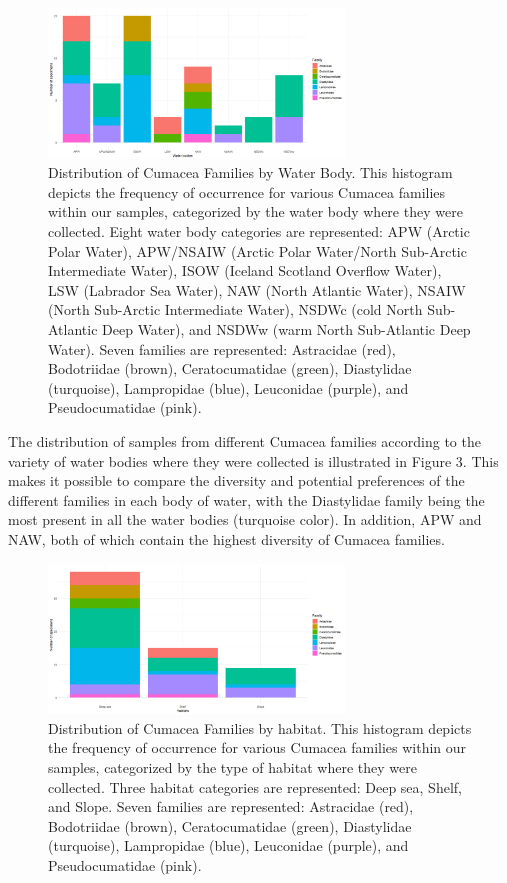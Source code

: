 \begin{figure}[htbp]
    \centering
    \includegraphics[width=0.7\textwidth]{figure3.png}
    \caption{Distribution of Cumacea Families by Water Body. This histogram depicts the frequency of occurrence for various Cumacea families within our samples, categorized by the water body where they were collected. Eight water body categories are represented: APW (Arctic Polar Water), APW/NSAIW (Arctic Polar Water/North Sub-Arctic Intermediate Water), ISOW (Iceland Scotland Overflow Water), LSW (Labrador Sea Water), NAW (North Atlantic Water), NSAIW  (North Sub-Arctic Intermediate Water), NSDWc (cold North Sub-Atlantic Deep Water), and NSDWw (warm North Sub-Atlantic Deep Water). Seven families are represented: Astracidae (red), Bodotriidae (brown), Ceratocumatidae (green), Diastylidae (turquoise), Lampropidae (blue), Leuconidae (purple), and Pseudocumatidae (pink). \label{fig:fig3}}
\end{figure}

The distribution of samples from different Cumacea families according to the variety of water bodies where they were collected is illustrated in Figure 3. This makes it possible to compare the diversity and potential preferences of the different families in each body of water, with the Diastylidae family being the most present in all the water bodies (turquoise color). In addition, APW and NAW, both of which contain the highest diversity of Cumacea families.

\begin{figure}[]
    \centering
    \includegraphics[width=0.7\textwidth]{figure4.png}
    \caption{Distribution of Cumacea Families by habitat. This histogram depicts the frequency of occurrence for various Cumacea families within our samples, categorized by the type of habitat where they were collected. Three habitat categories are represented: Deep sea, Shelf, and Slope. Seven families are represented: Astracidae (red), Bodotriidae (brown), Ceratocumatidae (green), Diastylidae (turquoise), Lampropidae (blue), Leuconidae (purple), and Pseudocumatidae (pink).  \label{fig:fig4}}
\end{figure}

